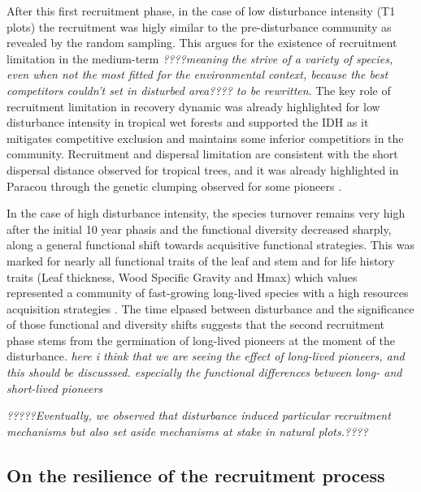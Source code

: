 \documentclass[fleqn,10pt]{ArtEcoFoG} %
\begin{document}
After this first recruitment phase, in the case of low disturbance
intensity (T1 plots) the recruitment was higly similar to the
pre-disturbance community as revealed by the random sampling. This
argues for the existence of recruitment limitation in the medium-term
\emph{????meaning the strive of a variety of species, even when not the
most fitted for the environmental context, because the best competitors
couldn't set in disturbed area???? to be rewritten}. The key role of
recruitment limitation in recovery dynamic was already highlighted for
low disturbance intensity in tropical wet forests
\citep{Hubbell1999, Sheil2003, Bongers2009} and supported the IDH as it
mitigates competitive exclusion and maintains some inferior competitiors
in the community. Recruitment and dispersal limitation are consistent
with the short dispersal distance observed for tropical trees, and it
was already highlighted in Paracou through the genetic clumping observed
for some pioneers \citep{Leclerc2015, Scotti2015a}.

In the case of high disturbance intensity, the species turnover remains
very high after the initial 10 year phasis and the functional diversity
decreased sharply, along a general functional shift towards acquisitive
functional strategies. This was marked for nearly all functional traits
of the leaf and stem and for life history traits (Leaf thickness, Wood
Specific Gravity and Hmax) which values represented a community of
fast-growing long-lived species with a high resources acquisition
strategies \citep{Wright2004, Chave2009b, Herault2011, Reich2014}. The
time elpased between disturbance and the significance of those
functional and diversity shifts suggests that the second recruitment
phase stems from the germination of long-lived pioneers at the moment of
the disturbance. \emph{here i think that we are seeing the effect of
long-lived pioneers, and this should be discusssed. especially the
functional differences between long- and short-lived pioneers}

\emph{?????Eventually, we observed that disturbance induced particular
recruitment mechanisms but also set aside mechanisms at stake in natural
plots.????}

\subsection{On the resilience of the recruitment
process}\label{on-the-resilience-of-the-recruitment-process}
\end{document}
